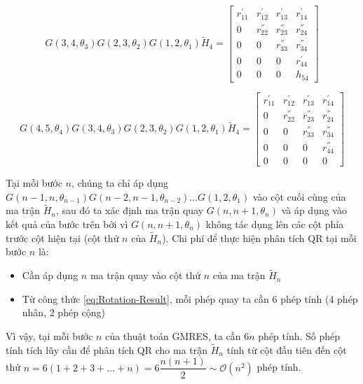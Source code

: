 \documentclass[14pt, a4paper]{article}
\numberwithin{equation}{section}
\numberwithin{algorithm}{section}
\numberwithin{figure}{section}
\numberwithin{dl}{section}
\numberwithin{md}{section}
\numberwithin{bd}{section}
\numberwithin{dn}{section}
\begin{document}
\begin{equation}
    G(3, 4, \theta_3)G(2, 3, \theta_2)G(1, 2, \theta_1) \widetilde{H}_4 = \begin{bmatrix} r_{11}^{'} & r_{12}^{'} & r_{13}^{'} & r_{14}^{'} \\
        0 & r_{22}^{''} & r_{23}^{''} & r_{24}^{''} \\
        0 & 0 & r_{33}^{''} & r_{34}^{''} \\
        0 & 0 & 0 & r_{44}^{'} \\
        0 & 0 & 0 & h_{54}  \end{bmatrix}
\end{equation}

\begin{equation}
    G(4, 5, \theta_4)G(3, 4, \theta_3)G(2, 3, \theta_2)G(1, 2, \theta_1) \widetilde{H}_4 = \begin{bmatrix} r_{11}^{'} & r_{12}^{'} & r_{13}^{'} & r_{14}^{'} \\
        0 & r_{22}^{''} & r_{23}^{''} & r_{24}^{''} \\
        0 & 0 & r_{33}^{''} & r_{34}^{''} \\
        0 & 0 & 0 & r_{44}^{''} \\
        0 & 0 & 0 & 0  \end{bmatrix}
\end{equation}

Tại mỗi bước $n$, chúng ta chỉ áp dụng $G(n-1, n, \theta_{n-1})G(n-2, n-1, \theta_{n-2})\dots G(1, 2, \theta_1)$ vào cột cuối cùng của ma trận $\widetilde{H}_n$, sau đó ta xác định ma trận quay $G(n, n+1, \theta_{n})$ và áp dụng vào kết quả của bước trên bởi vì $G(n, n+1, \theta_{n})$ không tác dụng lên các cột phía trước cột hiện tại (cột thứ $n$ của $\widetilde{H}_n$). Chi phí để thực hiện phân tích QR tại mỗi bước $n$ là:

\begin{itemize}
    \item Cần áp dụng $n$ ma trận quay vào cột thứ $n$ của ma trận $\widetilde{H}_n$
    \item Từ công thức \ref{eq:Rotation-Result}, mỗi phép quay ta cần 6 phép tính (4 phép nhân, 2 phép cộng)
\end{itemize}

Vì vậy, tại mỗi bước $n$ của thuật toán GMRES, ta cần $6n$ phép tính. Số phép tính tích lũy cần để phân tích QR cho ma trận $\widetilde{H}_n$ tính từ cột đầu tiên đến cột thứ $n=6(1+2+3+\dots+n)=6\dfrac{n(n+1)}{2}\sim \mathcal{O}(n^2)$
phép tính.
\end{document}
